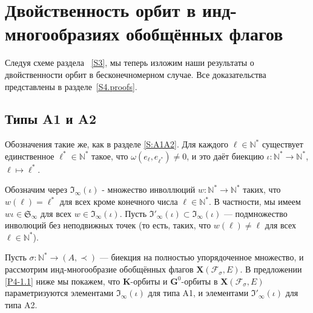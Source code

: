 \documentclass{amsart}
\theoremstyle{definition}
\newcommand{\NN}{\mathbb{N}^*}
\begin{document}
\section{Двойственность орбит в инд-многообразиях обобщённых флагов}

\label{S4}

Следуя схеме раздела ~\ref{S3}, мы теперь изложим наши результаты о двойственности орбит в бесконечномерном случае.  Все доказательства представлены в разделе~\ref{S4.proofs}.
\subsection{Типы A1 и A2}

\label{S4.1}

Обозначения такие же, как  в разделе \ref{S:A1A2}.
Для каждого $\ell\in\NN$ существует единственное $\ell^*\in\NN$
такое, что $\omega(e_\ell,e_{\ell^*})\not=0$, и
это даёт биекцию $\iota:\NN\to\NN$, $\ell\mapsto\ell^*$.

Обозначим через $\mathfrak{I}_\infty(\iota)$ - множество инволлюций $w:\NN\to\NN$
таких, что $w(\ell)=\ell^*$ для всех кроме конечного числа $\ell\in\NN$.
В частности, мы имеем $w\iota\in\mathfrak{S}_\infty$ для всех $w\in\mathfrak{I}_\infty(\iota)$.
Пусть $\mathfrak{I}'_\infty(\iota)\subset \mathfrak{I}_\infty(\iota)$ ---
подмножество инволюций без неподвижных точек (то есть, таких, что $w(\ell)\not=\ell$ для всех $\ell\in\NN$).

Пусть $\sigma:\NN\to(A,\prec)$ --- биекция на полностью упорядоченное множество,
и  рассмотрим инд-многообразие обобщённых флагов $\mathbf{X}(\mathcal{F}_\sigma,E)$.
В предложении \ref{P4-1.1} ниже мы покажем, что $\mathbf{K}$-орбиты
и $\mathbf{G}^0$-орбиты в $\mathbf{X}(\mathcal{F}_\sigma,E)$ параметризуются элементами $\mathfrak{I}_\infty(\iota)$ для типа A1, и элементами $\mathfrak{I}'_\infty(\iota)$ для типа A2.
\end{document}
